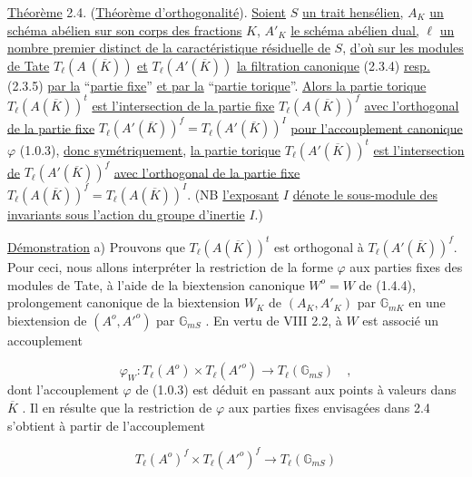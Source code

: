 \underline{Théorème} 2.4. (\underline{Théorème d'orthogonalité}). \underline{Soient} $S$ \underline{un trait hensélien,} $A_K$ \underline{un schéma abélien sur son corps des fractions} $K$, $A'_K$ \underline{le schéma abélien dual,} $\ell$ \underline{un nombre premier distinct de la caractéristique résiduelle de} $S$, \underline{d'où sur les modules de Tate} $T_\ell(A\ (\overline{K}))$ \underline{et} $T_\ell(A'(\overline{K}))$ \underline{la filtration canonique} (2.3.4) \underline{resp.} (2.3.5) \underline{par la} ``\underline{partie fixe}'' \underline{et par la} ``\underline{partie torique}''. \underline{Alors la partie torique} $T_\ell(A(\overline{K}))^t$ \underline{est l'intersection de la partie fixe} $T_\ell(A(\overline{K}))^f$ \underline{avec l'orthogonal de la partie fixe} $T_\ell(A'(\overline{K}))^f = T_\ell(A'(\overline{K}))^I$ \underline{pour l'accouplement canonique} $\varphi$ (1.0.3), \underline{donc symétriquement}, \underline{la partie torique} $T_\ell(A'(\overline{K}))^t$ \underline{est l'intersection de} $T_\ell(A'(\overline{K}))^f$ \underline{avec l'orthogonal de la partie fixe} $T_\ell(A(\overline{K}))^f = T_\ell(A(\overline{K}))^I$. (NB \underline{l'exposant} $I$ \underline{dénote le sous-module des invariants sous l'action du groupe d'inertie} $I$.)

\underline{Démonstration} \quad a) \quad Prouvons que $T_\ell(A(\overline{K}))^t$ est orthogonal à $T_\ell(A'(\overline{K}))^f$. Pour ceci, nous allons interpréter la restriction de la forme $\varphi$ aux parties fixes des modules de Tate, à l'aide de la biextension canonique $W^o = W$ de (1.4.4), prolongement canonique de la biextension $W_K$ de $(A_K , A'_K)$ par $\mathbb{G}_{mK}$ en une biextension de $(A^o , {A'}^o)$ par $\mathbb{G}_{mS}$ . En vertu de VIII 2.2, à $W$ est associé un accouplement

\begin{equation}\tag{2.4.1}
\varphi_W : T_\ell(A^o) \times T_\ell({A'}^o) \longrightarrow T_\ell(\mathbb{G}_{mS}) \quad ,
\end{equation}
dont l'accouplement $\varphi$ de (1.0.3) est déduit en passant aux points à valeurs dans $\overline{K}$ . Il en résulte que la restriction de $\varphi$ aux parties fixes envisagées dans 2.4 s'obtient à partir de l'accouplement

\begin{equation}\tag{2.4.2}
T_\ell(A^o)^f \times T_\ell({A'}^o)^f \longrightarrow T_\ell(\mathbb{G}_{mS})
\end{equation}

